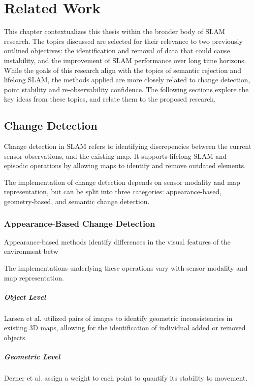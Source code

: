 \section{Related Work}
\label{sec:related_work}

This chapter contextualizes this thesis within the broader body of SLAM research. The topics discussed are selected for their relevance to two previously outlined objectives: the identification and removal of data that could cause instability, and the improvement of SLAM performance over long time horizons. While the goals of this research align with the topics of semantic rejection and lifelong SLAM, the methods applied are more closely related to change detection, point stability and re-observability confidence. The following sections explore the key ideas from these topics, and relate them to the proposed research.

\subsection{Change Detection}

Change detection in SLAM refers to identifying discrepencies between the current sensor observations, and the existing map. It supports lifelong SLAM and episodic operations by allowing maps to identify and remove outdated elements.

The implementation of change detection depends on sensor modality and map representation, but can be split into three categories: appearance-based, geometry-based, and semantic change detection.

\subsubsection{Appearance-Based Change Detection}

Appearance-based methods identify differences in the visual features of the environment betw

The implementations underlying these operations vary with sensor modality and map representation.




\subparagraph{Object Level}
Larsen et al. \cite{larsenChangeDetectionModel} utilized pairs of images to identify geometric inconsistencies in existing 3D maps, allowing for the identification of individual added or removed objects.

\subparagraph{Geometric Level}
Derner et al. \cite{dernerChangeDetectionUsing2021} assign a weight to each point to quantify its stability to movement.




